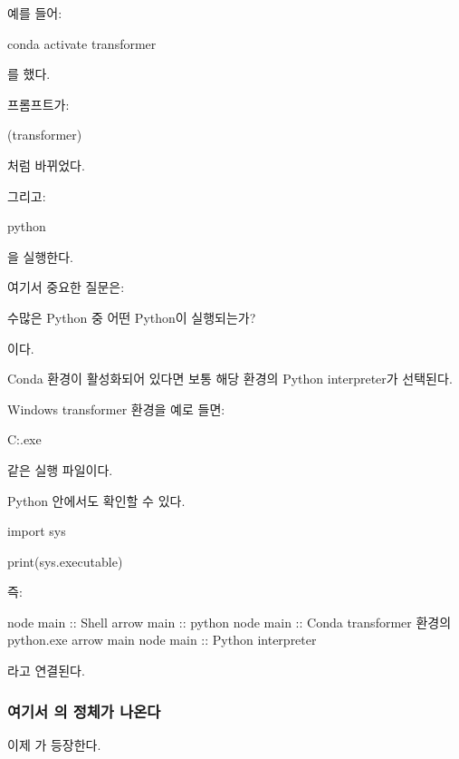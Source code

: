 예를 들어:

\begin{dhkzsh}
conda activate transformer
\end{dhkzsh}

를 했다.

프롬프트가:

\begin{dhkzsh}
(transformer) %
\end{dhkzsh}

처럼 바뀌었다.

그리고:

\begin{dhkzsh}
python
\end{dhkzsh}

을 실행한다.

여기서 중요한 질문은:

\begin{dhksmry}[centered]
수많은 Python 중 어떤 Python이 실행되는가?
\end{dhksmry}


이다.

Conda 환경이 활성화되어 있다면 보통 해당 환경의 Python interpreter가 선택된다.

Windows transformer 환경을 예로 들면:

\begin{dhkzsh}
C:\Users\user{}\envs\transformer\python.exe
\end{dhkzsh}

같은 실행 파일이다.

Python 안에서도 확인할 수 있다.

\begin{dhkcode}
import sys

print(sys.executable)
\end{dhkcode}

즉:

\begin{dhkbranch}[in=8]
node main :: Shell
arrow main :: python
node main :: Conda transformer 환경의 python.exe
arrow main
node main :: Python interpreter
\end{dhkbranch}

라고 연결된다.

\subsubsection{여기서 의 정체가 나온다}

이제 가 등장한다.

